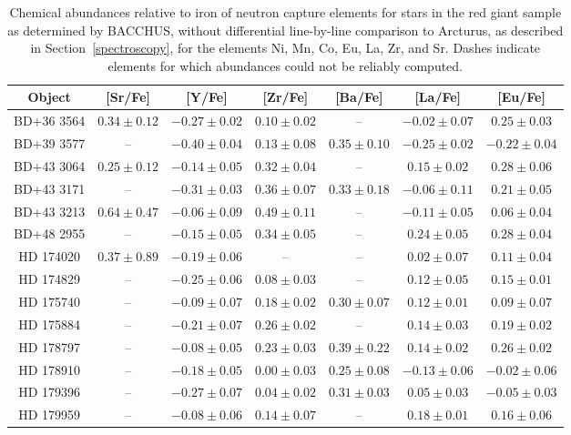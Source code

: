 \begin{table*}
\caption{Chemical abundances relative to iron of neutron capture elements for stars in the red giant sample as determined by BACCHUS, without differential line-by-line comparison to Arcturus, as described in Section~\ref{spectroscopy}, for the elements Ni, Mn, Co, Eu, La, Zr, and Sr. Dashes indicate elements for which abundances could not be reliably computed.\label{elems2}}
\begin{tabular}{ccccccc}
\hline \hline
Object & [Sr/Fe] & [Y/Fe] & [Zr/Fe] & [Ba/Fe] & [La/Fe] & [Eu/Fe] \\
\hline
BD+36 3564 & $0.34 \pm 0.12$ & $-0.27 \pm 0.02$ & $0.10 \pm 0.02$ & -- & $-0.02 \pm 0.07$ & $0.25 \pm 0.03$ \\
BD+39 3577 & -- & $-0.40 \pm 0.04$ & $0.13 \pm 0.08$ & $0.35 \pm 0.10$ & $-0.25 \pm 0.02$ & $-0.22 \pm 0.04$ \\
BD+43 3064 & $0.25 \pm 0.12$ & $-0.14 \pm 0.05$ & $0.32 \pm 0.04$ & -- & $0.15 \pm 0.02$ & $0.28 \pm 0.06$ \\
BD+43 3171 & -- & $-0.31 \pm 0.03$ & $0.36 \pm 0.07$ & $0.33 \pm 0.18$ & $-0.06 \pm 0.11$ & $0.21 \pm 0.05$ \\
BD+43 3213 & $0.64 \pm 0.47$ & $-0.06 \pm 0.09$ & $0.49 \pm 0.11$ & -- & $-0.11 \pm 0.05$ & $0.06 \pm 0.04$ \\
BD+48 2955 & -- & $-0.15 \pm 0.05$ & $0.34 \pm 0.05$ & -- & $0.24 \pm 0.05$ & $0.28 \pm 0.04$ \\
HD 174020 & $0.37 \pm 0.89$ & $-0.19 \pm 0.06$ & -- & -- & $0.02 \pm 0.07$ & $0.11 \pm 0.04$ \\
HD 174829 & -- & $-0.25 \pm 0.06$ & $0.08 \pm 0.03$ & -- & $0.12 \pm 0.05$ & $0.15 \pm 0.01$ \\
HD 175740 & -- & $-0.09 \pm 0.07$ & $0.18 \pm 0.02$ & $0.30 \pm 0.07$ & $0.12 \pm 0.01$ & $0.09 \pm 0.07$ \\
HD 175884 & -- & $-0.21 \pm 0.07$ & $0.26 \pm 0.02$ & -- & $0.14 \pm 0.03$ & $0.19 \pm 0.02$ \\
HD 178797 & -- & $-0.08 \pm 0.05$ & $0.23 \pm 0.03$ & $0.39 \pm 0.22$ & $0.14 \pm 0.02$ & $0.26 \pm 0.02$ \\
HD 178910 & -- & $-0.18 \pm 0.05$ & $0.00 \pm 0.03$ & $0.25 \pm 0.08$ & $-0.13 \pm 0.06$ & $-0.02 \pm 0.06$ \\
HD 179396 & -- & $-0.27 \pm 0.07$ & $0.04 \pm 0.02$ & $0.31 \pm 0.03$ & $0.05 \pm 0.03$ & $-0.05 \pm 0.03$ \\
HD 179959 & -- & $-0.08 \pm 0.06$ & $0.14 \pm 0.07$ & -- & $0.18 \pm 0.01$ & $0.16 \pm 0.06$ \\

\end{tabular}
\end{table*}
